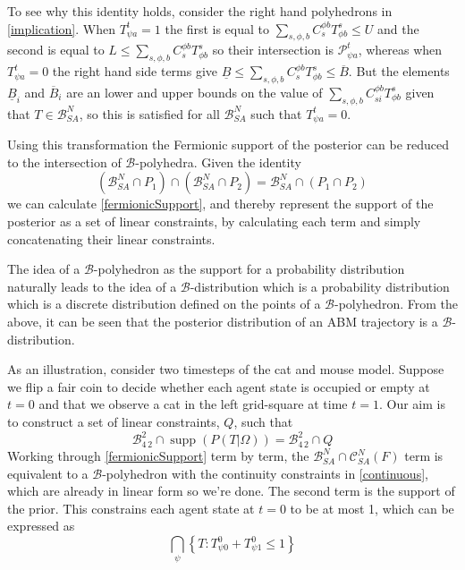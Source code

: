 \documentclass{article}
\DeclareMathOperator\supp{supp}
\begin{document}
To see why this identity holds, consider the right hand polyhedrons in \eqref{implication}. When $T^t_{\psi a}=1$ the first is equal to $\sum_{s,\phi,b} C^{\phi b}_{s} T^s_{\phi b} \le U$ and the second is equal to $L \le \sum_{s,\phi,b} C^{\phi b}_{s} T^s_{\phi b}$ so their intersection is $\mathcal{P}^t_{\psi a}$, whereas when $T^t_{\psi a}=0$ the right hand side terms give $\underline{B} \le \sum_{s,\phi,b} C^{\phi b}_{s} T^s_{\phi b} \le \overline{B}$. But the elements $\underline{B}_i$ and $\overline{B}_i$ are an lower and upper bounds on the value of $\sum_{s,\phi,b} C^{\phi b}_{si} T^s_{\phi b}$ given that $T\in\mathcal{B}^N_{SA}$, so this is satisfied for all $\mathcal{B}^N_{SA}$ such that $T^t_{\psi a}=0$.

Using this transformation the Fermionic support of the posterior can be reduced to the intersection of $\mathcal{B}$-polyhedra. Given the identity
\[
(\mathcal{B}^N_{SA} \cap P_1) \cap (\mathcal{B}^N_{SA} \cap P_2) = \mathcal{B}^N_{SA} \cap (P_1 \cap P_2)
\]
we can calculate \eqref{fermionicSupport}, and thereby represent the support of the posterior as a set of linear constraints, by calculating each term and simply concatenating their linear constraints.

The idea of a $\mathcal{B}$-polyhedron as the support for a probability distribution naturally leads to the idea of a $\mathcal{B}$-distribution which is a probability distribution which is a discrete distribution defined on the points of a $\mathcal{B}$-polyhedron. From the above, it can be seen that the posterior distribution of an ABM trajectory is a $\mathcal{B}$-distribution.

As an illustration, consider two timesteps of the cat and mouse model. Suppose we flip a fair coin to decide whether each agent state is occupied or empty at $t=0$ and that we observe a cat in the left grid-square at time $t=1$. Our aim is to construct a set of linear constraints, $Q$, such that
\[
\mathcal{B}^2_{4\,2} \cap \supp(P(T|\Omega)) = \mathcal{B}^2_{4\,2} \cap Q
\]
Working through \eqref{fermionicSupport} term by term, the $\mathcal{B}^N_{SA} \cap \mathcal{C}^N_{SA}(F)$ term is equivalent to a $\mathcal{B}$-polyhedron with the continuity constraints in \eqref{continuous}, which are already in linear form so we're done. The second term is the support of the prior. This constrains each agent state at $t=0$ to be at most 1, which can be expressed as
\[
\bigcap_\psi \left\{T:T^0_{\psi 0} + T^0_{\psi 1} \le 1\right\}
\]
\end{document}
